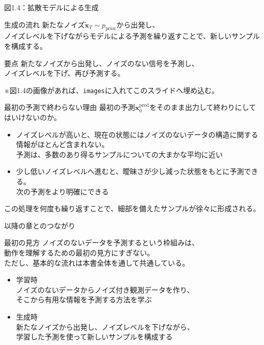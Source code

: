 \begin{frame}{図1.4：拡散モデルによる生成}
    \begin{block}{生成の流れ}
        新たなノイズ\(\tilde{\boldsymbol{x}}_{T}\sim p_{\mathrm{prior}}\)から出発し、\\
        ノイズレベルを下げながらモデルによる予測を繰り返すことで、新しいサンプルを構成する。
    \end{block}
    \vspace{0.6em}
    \begin{exampleblock}{要点}
        新たなノイズから出発し、ノイズのない信号を予測し、\\
        ノイズレベルを下げ、再び予測する。
    \end{exampleblock}
    \vspace{0.6em}
    ※図1.4の画像があれば、\texttt{images}に入れてこのスライドへ埋め込む。
\end{frame}
\begin{frame}{最初の予測で終わらない理由}
    最初の予測\(\boldsymbol{x}_{0}^{\mathrm{pred}}\)をそのまま出力して終わりにしてはいけないのか。
    \vspace{0.6em}
    \begin{itemize}
        \item ノイズレベルが高いと、現在の状態にはノイズのないデータの構造に関する情報がほとんど含まれない。\\
        予測は、多数のあり得るサンプルについての大まかな平均に近い
        \item 少し低いノイズレベルへ進むと、曖昧さが少し減った状態をもとに予測できる。\\
        次の予測をより明確にできる
    \end{itemize}
    \vspace{0.5em}
    この処理を何度も繰り返すことで、細部を備えたサンプルが徐々に形成される。
\end{frame}
\begin{frame}{以降の章とのつながり}
    \begin{block}{最初の見方}
        ノイズのないデータを予測するという枠組みは、\\
        動作を理解するための最初の見方にすぎない。\\
        ただし、基本的な流れは本書全体を通して共通している。
    \end{block}
    \vspace{0.6em}
    \begin{itemize}
        \item 学習時\\
        ノイズのないデータからノイズ付き観測データを作り、\\
        そこから有用な情報を予測する方法を学ぶ
        \item 生成時\\
        新たなノイズから出発し、ノイズレベルを下げながら、\\
        学習した予測を使って新しいサンプルを構成する
    \end{itemize}
\end{frame}
